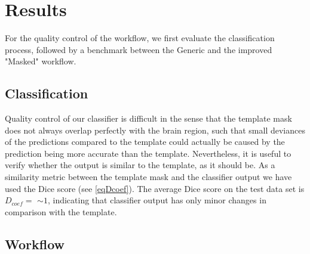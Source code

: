 \section{Results}
For the quality control of the workflow, we first evaluate the classification process, followed by a benchmark between the Generic and the improved "Masked" workflow.

\subsection{Classification}
Quality control of our classifier is difficult in the sense that the template mask does not always overlap perfectly with the brain region, such that small deviances of the predictions compared to the template could actually be caused by the prediction being more accurate than the template.
Nevertheless, it is useful to verify whether the output is similar to the template, as it should be.
As a similarity metric between the template mask and the classifier output we have used the Dice score (see \cref{eqDcoef}).
The average Dice score on the test data set is $D_{coef}= $
$\sim 1$, indicating that classifier output has only minor changes in comparison with the template.


\subsection{Workflow}
\begin{sansmath}
\end{sansmath}

